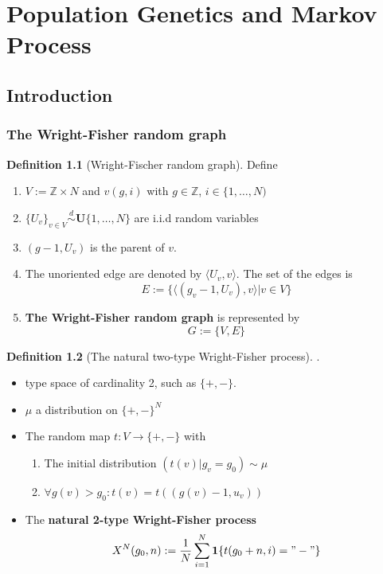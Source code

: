 \documentclass[a4paper,11pt]{book}
\theoremstyle{definition}
\newtheorem{definition}{Definition}[section]
\theoremstyle{remark}
\begin{document}
\chapter{Population Genetics and Markov Process}
\section{Introduction}
\subsection{The Wright-Fisher random graph}
\begin{definition}[Wright-Fischer random graph]
	Define
	\begin{enumerate}
		\item $V:= \mathbb{Z} \times N$ and $v(g, i)$ with $g \in \mathbb{Z}$, $i \in \{1, \dots, N)$
		\item $\{U_v\}_{v \in V} \overset{d}{\sim} \textbf{U}\{1, \dots, N \}$ are i.i.d random variables
		\item $(g - 1, U_v)$ is the parent of $v$.
		\item The unoriented edge are denoted by $\langle U_v, v \rangle$. The set of the edges is  
			\begin{equation*}
				E:= \{\langle (g_v - 1, U_v), v \rangle | v \in V \}
			\end{equation*}
		\item \textbf{The Wright-Fisher random graph} is represented by 
		 \begin{equation*}
		 	 G := \{V, E\}
		 \end{equation*}
	\end{enumerate}
\end{definition}

\begin{definition}[The natural two-type Wright-Fisher process].
\begin{itemize}
	\item type space of cardinality 2, such as $\{+, - \}$.
	\item $\mu$ a distribution on $\{+ , -\}^N$
	\item The random map $t: V \rightarrow \{+, -\}$ with 
	\begin{enumerate}
		\item The initial distribution $(t(v) | g_{v} = g_0 ) \sim \mu$
		\item $\forall g(v) > g_0: t(v) = t((g(v) - 1, u_v))$
	\end{enumerate}
	\item The \textbf{natural 2-type Wright-Fisher process}
	\begin{equation*}
		X^N(g_0, n) := \frac{1}{N}\sum_{i = 1}^N \textbf{1}\{t(g_0 + n, i) = "-"\}
	\end{equation*}
\end{itemize}
\end{definition}
\end{document}
